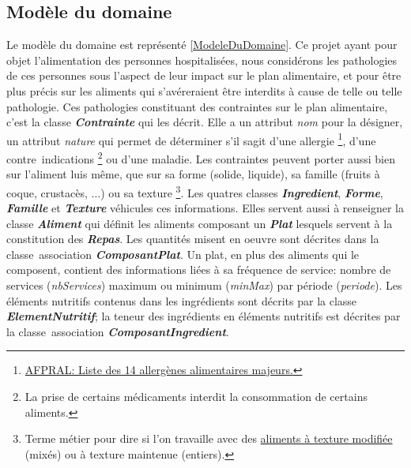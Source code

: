 \subsection{Modèle du domaine}

\newcommand{\classe}[1]{\emph{\textbf{#1}}}
\newcommand{\attribut}[1]{\emph{#1}}
\newcommand{\regleD}[1]{\textcolor{NavyBlue}{#1}}
\newcommand{\regleT}[1]{\textcolor{ForestGreen}{#1}}

Le modèle du domaine est représenté \autoref{ModeleDuDomaine}. Ce projet ayant pour objet l'alimentation des personnes hospitalisées, nous considérons les pathologies de ces personnes sous l'aspect de leur impact sur le plan alimentaire, et pour être plus précis sur les aliments qui s'avéreraient être interdits à cause de telle ou telle pathologie. Ces pathologies constituant des contraintes sur le plan alimentaire, c'est la classe \classe{Contrainte} qui les décrit. Elle a un attribut \attribut{nom} pour la désigner, un attribut \attribut{nature} qui permet de déterminer s'il sagit d'une allergie
\footnote{\label{allergies}\href{https://allergies.afpral.fr/allergie/en-savoir-plus-sur-les-allergies/alimentaires/89-liste-des-14-allergenes-alimentaires-majeurs}{AFPRAL: Liste des 14 allergènes alimentaires majeurs.}},
d'une contre~indications
\footnote{\label{contreIndications}La prise de certains médicaments interdit la consommation de certains aliments.}
ou d'une maladie.
Les contraintes peuvent porter aussi bien sur l'aliment luis même, que sur sa forme (solide, liquide), sa famille (fruits à coque, crustacès, ...) ou sa texture
\footnote{\label{textures}Terme métier pour dire si l'on travaille avec des \href{http://plone.vermeil.org:8080/ehpad/Bibliotheque/Memoires/annee-2012-2013/07 - Les textures modifiees et le plaisir de manger de Jacques Caby.pdf}{aliments à texture modifiée} (mixés) ou à texture maintenue (entiers).}.
Les quatres classes \classe{Ingredient}, \classe{Forme}, \classe{Famille} et \classe{Texture} véhicules ces informations. Elles servent aussi à renseigner la classe \classe{Aliment} qui définit les aliments composant un \classe{Plat} lesquels servent à la constitution des \classe{Repas}. Les quantités misent en oeuvre sont décrites dans la classe~association \classe{ComposantPlat}. Un plat, en plus des aliments qui le composent, contient des informations liées à sa fréquence de service: nombre de services (\attribut{nbServices}) maximum ou minimum (\attribut{minMax}) par période (\attribut{periode}). Les éléments nutritifs contenus dans les ingrédients sont décrits par la classe \classe{ElementNutritif}; la teneur des ingrédients en éléments nutritifs est décrites par la classe~association \classe{ComposantIngredient}.
